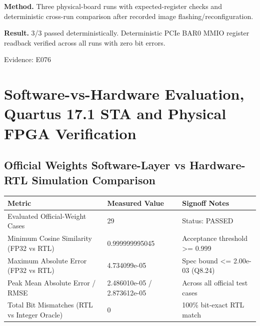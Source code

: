 \documentclass[11pt,a4paper]{article}
\begin{document}
\textbf{Method.} Three physical-board runs with expected-register checks and deterministic cross-run comparison after recorded image flashing/\allowbreak{}reconfiguration.

\textbf{Result.} 3/\allowbreak{}3 passed deterministically. Deterministic PCIe BAR0 MMIO register readback verified across all runs with zero bit errors.

{\small Evidence: E076}

\section{Software-vs-Hardware Evaluation, Quartus 17.1 STA and Physical FPGA Verification}

\subsection{Official Weights Software-Layer vs Hardware-RTL Simulation Comparison}

{\small\renewcommand{\arraystretch}{1.18}\begin{longtable}{@{}L{0.38\textwidth}|L{0.26\textwidth}|L{0.28\textwidth}@{}}\toprule

\textbf{Metric} & \textbf{Measured Value} & \textbf{Signoff Notes}\\\midrule\endhead

Evaluated Official-Weight Cases & 29 & Status: PASSED\\[2pt]\hline

Minimum Cosine Similarity (\allowbreak{}FP32 vs RTL)\allowbreak{} & 0.99999999\allowbreak{}5045 & Acceptance threshold >=\allowbreak{} 0.999\\[2pt]\hline

Maximum Absolute Error (\allowbreak{}FP32 vs RTL)\allowbreak{} & 4.734099e-05 & Spec bound <=\allowbreak{} 2.00e-03 (\allowbreak{}Q8.24)\allowbreak{}\\[2pt]\hline

Peak Mean Absolute Error /\allowbreak{} RMSE & 2.486010e-05 /\allowbreak{} 2.873612e-05 & Across all official test cases\\[2pt]\hline

Total Bit Mismatches (\allowbreak{}RTL vs Integer Oracle)\allowbreak{} & 0 & 100\% bit-exact RTL match\\[2pt]\hline

\bottomrule\end{longtable}}
\end{document}
